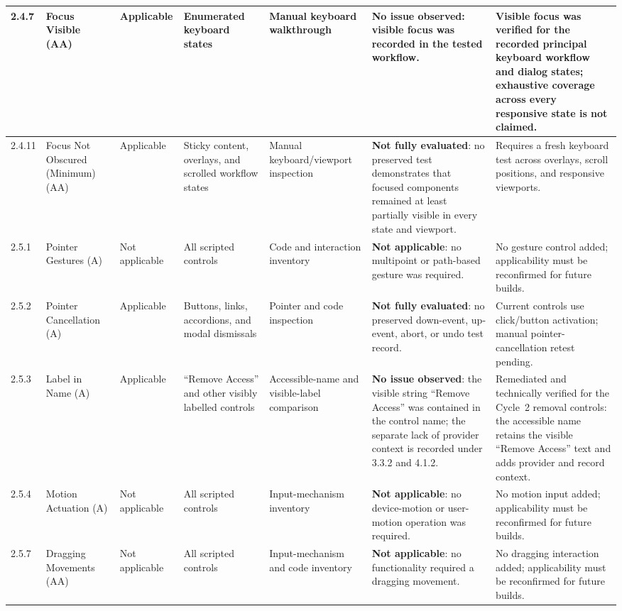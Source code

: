 \documentclass[10pt]{article}
\begin{document}
\begin{landscape}
{\begin{longtable}{|p{1.0cm}|p{3.3cm}|p{1.9cm}|p{2.7cm}|p{2.5cm}|p{4.1cm}|p{4.1cm}|}
2.4.7 & Focus Visible (AA) & Applicable & Enumerated keyboard states & Manual keyboard walkthrough & \textbf{No issue observed}: visible focus was recorded in the tested workflow. & Visible focus was verified for the recorded principal keyboard workflow and dialog states; exhaustive coverage across every responsive state is not claimed.\\\hline
2.4.11 & Focus Not Obscured (Minimum) (AA) & Applicable & Sticky content, overlays, and scrolled workflow states & Manual keyboard/viewport inspection & \textbf{Not fully evaluated}: no preserved test demonstrates that focused components remained at least partially visible in every state and viewport. & Requires a fresh keyboard test across overlays, scroll positions, and responsive viewports.\\\hline
2.5.1 & Pointer Gestures (A) & Not applicable & All scripted controls & Code and interaction inventory & \textbf{Not applicable}: no multipoint or path-based gesture was required. & No gesture control added; applicability must be reconfirmed for future builds.\\\hline
2.5.2 & Pointer Cancellation (A) & Applicable & Buttons, links, accordions, and modal dismissals & Pointer and code inspection & \textbf{Not fully evaluated}: no preserved down-event, up-event, abort, or undo test record. & Current controls use click/button activation; manual pointer-cancellation retest pending.\\\hline
2.5.3 & Label in Name (A) & Applicable & ``Remove Access'' and other visibly labelled controls & Accessible-name and visible-label comparison & \textbf{No issue observed}: the visible string ``Remove Access'' was contained in the control name; the separate lack of provider context is recorded under 3.3.2 and 4.1.2. & Remediated and technically verified for the Cycle~2 removal controls: the accessible name retains the visible ``Remove Access'' text and adds provider and record context.\\\hline
2.5.4 & Motion Actuation (A) & Not applicable & All scripted controls & Input-mechanism inventory & \textbf{Not applicable}: no device-motion or user-motion operation was required. & No motion input added; applicability must be reconfirmed for future builds.\\\hline
2.5.7 & Dragging Movements (AA) & Not applicable & All scripted controls & Input-mechanism and code inventory & \textbf{Not applicable}: no functionality required a dragging movement. & No dragging interaction added; applicability must be reconfirmed for future builds.\\\hline

\end{longtable}}
\end{landscape}
\end{document}
